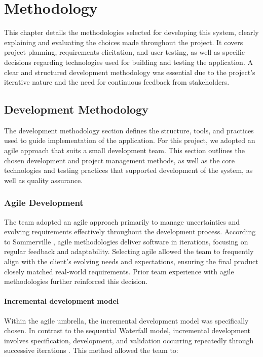 \chapter{Methodology}
\label{ch:methodology} 
This chapter details the methodologies selected for developing this system, clearly explaining and evaluating the choices made throughout the project. It covers project planning, requirements elicitation, and user testing, as well as specific decisions regarding technologies used for building and testing the application. A clear and structured development methodology was essential due to the project's iterative nature and the need for continuous feedback from stakeholders.


\section{Development Methodology}
\label{sec:development_methodology}
The development methodology section defines the structure, tools, and practices used to guide implementation of the application. For this project, we adopted an agile approach that suits a small development team. This section outlines the chosen development and project management methods, as well as the core technologies and testing practices that supported development of the system, as well as quality assurance.

\subsection{Agile Development}
\label{subsec:agile_development}
The team adopted an agile approach primarily to manage uncertainties and evolving requirements effectively throughout the development process. According to Sommerville \autocite[p. 631]{sommerville-2011}, agile methodologies deliver software in iterations, focusing on regular feedback and adaptability. Selecting agile allowed the team to frequently align with the client's evolving needs and expectations, ensuring the final product closely matched real-world requirements. Prior team experience with agile methodologies further reinforced this decision.

\subsubsection{Incremental development model}
Within the agile umbrella, the incremental development model was specifically chosen. In contrast to the sequential Waterfall model, incremental development involves specification, development, and validation occurring repeatedly through successive iterations \autocite[p. 29-30]{sommerville-2011}. This method allowed the team to:

